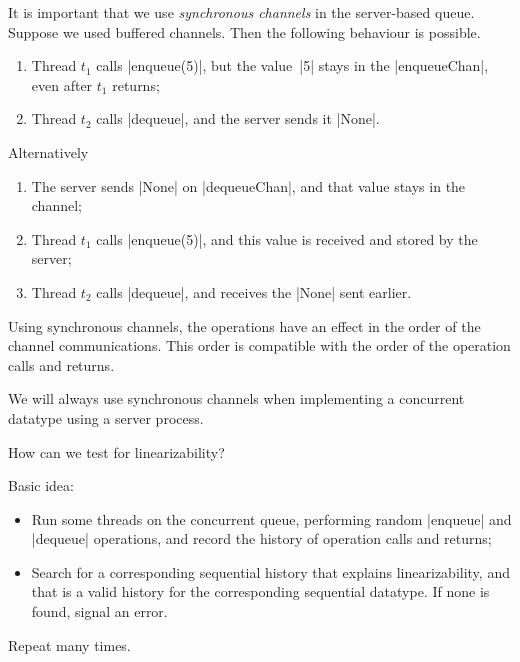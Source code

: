 
\begin{slide}

It is important that we use \emph{synchronous channels} in the server-based
queue.  Suppose we used buffered channels.  Then the following behaviour is
possible.
%
\begin{enumerate}
\item Thread $t_1$ calls |enqueue(5)|, but the value~|5| stays in the
  |enqueueChan|, even after $t_1$ returns;

\item Thread $t_2$ calls |dequeue|, and the server sends it |None|.
\end{enumerate}

Alternatively
%
\begin{enumerate}
\item The server sends |None| on |dequeueChan|, and that value stays in the
  channel; 

\item Thread $t_1$ calls |enqueue(5)|, and this value is received and stored
  by the server; 

\item Thread $t_2$ calls |dequeue|, and receives the |None| sent earlier.
\end{enumerate}
\end{slide}


\begin{slide}

Using synchronous channels, the operations have an effect in the order of the
channel communications.  This order is compatible with the order of the
operation calls and returns.

We will always use synchronous channels when implementing a concurrent
datatype using a server process.   
\end{slide}



\begin{slide}

How can we test for linearizability?

Basic idea: 
%
\begin{itemize}
\item Run some threads on the concurrent queue, performing random |enqueue|
and |dequeue| operations, and record the history of operation calls and
returns;

\item Search for a corresponding sequential history that explains
linearizability, and that is a valid history for the corresponding sequential
datatype.  If none is found, signal an error.
\end{itemize}
%
Repeat many times.
\end{slide}

